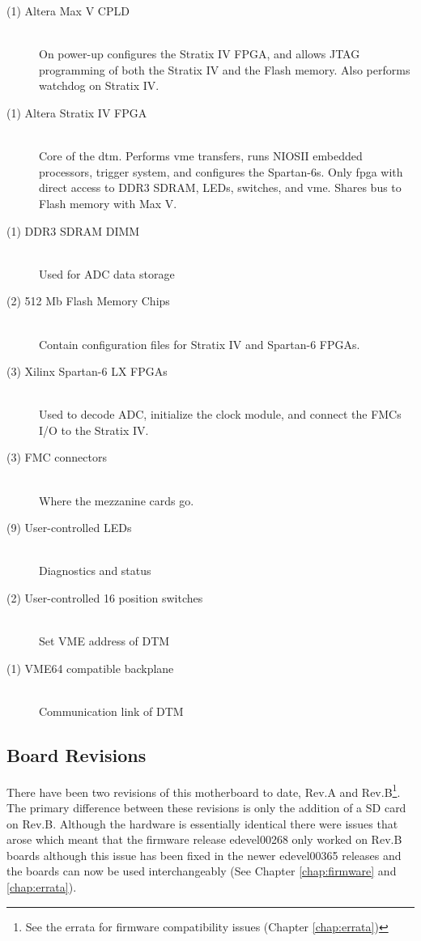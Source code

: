 \begin{description}
	\item[(1) Altera Max V CPLD] \hfill \\
	On power-up configures the Stratix IV FPGA, and allows JTAG programming of both the Stratix IV and the Flash memory. Also performs watchdog on Stratix IV.
	
	\item[(1) Altera Stratix IV FPGA] \hfill \\
	Core of the \gls{dtm}. Performs \gls{vme} transfers, runs NIOSII embedded processors, trigger system, and configures the Spartan-6s. Only \gls{fpga} with direct access to DDR3 SDRAM, LEDs, switches, and \gls{vme}. Shares bus to Flash memory with Max V.
	
	\item[(1) DDR3 SDRAM DIMM] \hfill \\
	Used for ADC data storage
	
	\item[(2) 512 Mb Flash Memory Chips] \hfill \\ 
	Contain configuration files for Stratix IV and Spartan-6 FPGAs. 
	
	\item[(3) Xilinx Spartan-6 LX FPGAs] \hfill \\
	Used to decode ADC, initialize the clock module, and connect the FMCs I/O to the Stratix IV.
	
	\item[(3) FMC connectors] \hfill \\ 
	Where the mezzanine cards go.
	
	\item[(9) User-controlled LEDs] \hfill \\ 
	Diagnostics and status
	
	\item[(2) User-controlled 16 position switches] \hfill \\ 
	Set VME address of DTM
	
	\item[(1) VME64 compatible backplane] \hfill \\ 
	Communication link of DTM
\end{description}


\subsection{Board Revisions}

There have been two revisions of this motherboard to date, Rev.A and Rev.B\footnote{See the errata for firmware compatibility issues (Chapter \ref{chap:errata})}. The primary difference between these revisions is only the addition of a SD card on Rev.B. Although the hardware is essentially identical there were issues that arose which meant that the firmware release edevel00268 only worked on Rev.B boards although this issue has been fixed in the newer edevel00365 releases and the boards can now be used interchangeably (See Chapter \ref{chap:firmware} and \ref{chap:errata}).


